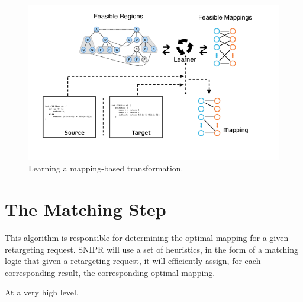 \begin{figure}[!ht]
    \centering
    \includegraphics[width=\textwidth]{images/mappinggeneration}
    \caption{Learning a mapping-based transformation.}
    \label{fig:mappinggeneration}
\end{figure}

\section{The Matching Step}
\label{sec:precomputation}

This algorithm is responsible for determining the optimal mapping for a given retargeting request. SNIPR will use a set of heuristics, in the form of a matching logic that given a retargeting request, it will efficiently assign, for each corresponding result, the corresponding optimal mapping. 

At a very high level, 
